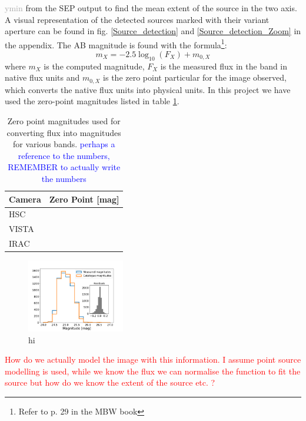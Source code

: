\textcolor{darkgray}{ymin} from the SEP output to find the mean extent of the source in the two axis. A visual representation of the detected sources marked with their variant aperture can be found in fig. \ref{Source_detection} and \ref{Source_detection_Zoom} in the appendix. The AB magnitude is found with the formula\footnote{Refer to p. 29 in the MBW book}:
\begin{equation}
    m_X = -2.5\log_{10}(F_X) + m_{0,X}
\end{equation}
where $m_X$ is the computed magnitude, $F_X$ is the measured flux in the band in native flux units and $m_{0,X}$ is the zero point particular for the image observed, which converts the native flux units into physical units. In this project we have used the zero-point magnitudes listed in table \ref{zero_point}.
\begin{table}
    \begin{tabular}{ll}
    \hline
    \textbf{Camera} & \textbf{Zero Point [mag]} \\ \hline
    HSC &  \\ \hline
    VISTA &  \\ \hline
    IRAC &  \\ \hline
    \end{tabular}
    \caption{Zero point magnitudes used for converting flux into magnitudes for various bands. \textcolor{blue}{perhaps a reference to the numbers, REMEMBER to actually write the numbers}}
    \label{zero_point}
\end{table}

\begin{figure}
    \centering %
    \includegraphics[trim={1cm 0 2cm 1.5cm},clip,width=0.38\textwidth]{Code/Saved_Figures/Mag_hist.pdf}
    \caption{hi}
    \label{mag_hist}  
\end{figure}


\textcolor{red}{How do we actually model the image with this information. I assume point source modelling is used, while we know the flux we can normalise the function to fit the source but how do we know the extent of the source etc. ?}


